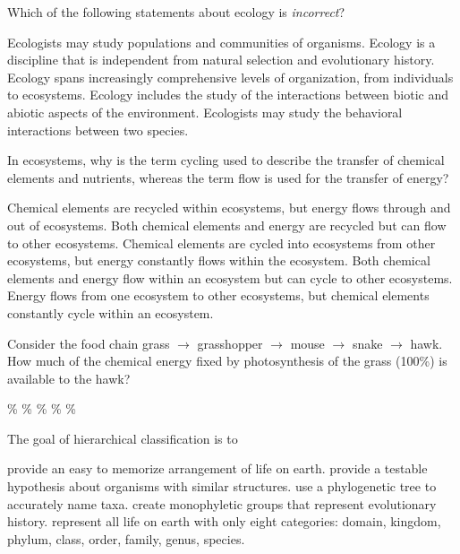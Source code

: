\question
Which of the following statements about ecology is \emph{incorrect}? 

\begin{choices}
\choice Ecologists may study populations and communities of organisms. %
\correctchoice Ecology is a discipline that is independent from natural selection and evolutionary history. %
\choice Ecology spans increasingly comprehensive levels of organization, from individuals to ecosystems. %
\choice Ecology includes the study of the interactions between biotic and abiotic aspects of the environment. %
\choice Ecologists may study the behavioral interactions between two species.%
\end{choices}

\question
In ecosystems, why is the term cycling used to describe the transfer of chemical elements and nutrients, whereas the term flow is used for the transfer of energy?

\begin{choices}
\correctchoice Chemical elements are recycled within ecosystems, but energy flows through and out of ecosystems.%
\choice Both chemical elements and energy are recycled but can flow to other ecosystems.%
\choice Chemical elements are cycled into ecosystems from other ecosystems, but energy constantly flows within the ecosystem.%
\choice Both chemical elements and energy flow within an ecosystem but can cycle to other ecosystems.%
\choice Energy flows from one ecosystem to other ecosystems, but chemical elements constantly cycle within an ecosystem.%
\end{choices}

\question
Consider the food chain grass $\to$ grasshopper $\to$ mouse $\to$ snake $\to$ hawk. How much of the chemical energy fixed by photosynthesis of the grass (100\%) is available to the hawk?

\begin{choices}
\%%
\%%
\%%
\%%
\%%
\end{choices}

\question
The goal of hierarchical classification is to

\begin{choices}
\choice provide an easy to memorize arrangement of life on earth.%
\choice provide a testable hypothesis about organisms with similar structures.%
\choice use a phylogenetic tree to accurately name taxa.%
\correctchoice create monophyletic groups that represent evolutionary history.%
\choice represent all life on earth with only eight categories: domain, kingdom, phylum, class, order, family, genus, species.%
\end{choices}


